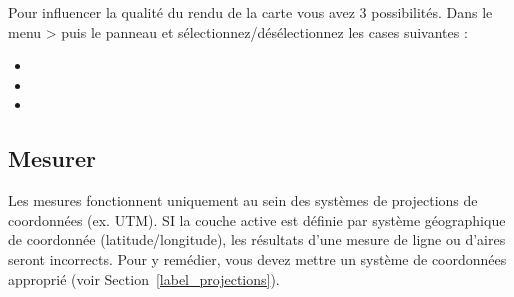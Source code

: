 \label{label_renderquality}

Pour influencer la qualit\'e du rendu de la carte vous avez 3 possibilit\'es. Dans le menu  >  puis le panneau  et s\'electionnez/d\'es\'electionnez les cases suivantes :

\begin{itemize}
\item {}
\item {}
\item {}
\end{itemize}

%

\subsection{Mesurer}\label{sec:measure}

Les mesures fonctionnent uniquement au sein des syst\`emes de projections de coordonn\'ees (ex. UTM). SI la couche active est d\'efinie par syst\`eme g\'eographique de coordonn\'ee (latitude/longitude), les r\'esultats d'une mesure de ligne ou d'aires seront incorrects. Pour y rem\'edier, vous devez mettre un syst\`eme de coordonn\'ees appropri\'e (voir Section~\ref{label_projections}).


